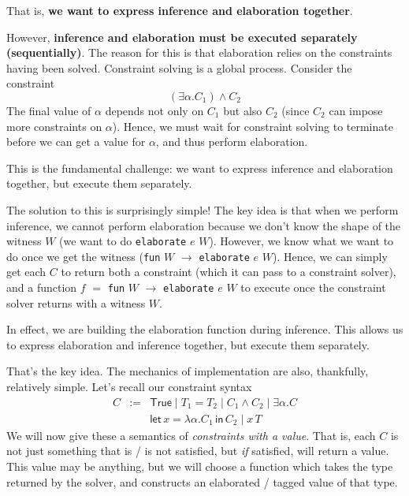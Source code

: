 {That is, \textbf{we want to express inference and elaboration together}. 

However, \textbf{inference and elaboration must be executed separately (sequentially)}. The reason for this is that elaboration relies on the constraints having been solved. Constraint solving is a global process. Consider the constraint 
\[(\exists \alpha. C_1) \land C_2\]
The final value of $\alpha$ depends not only on $C_1$ but also $C_2$ (since $C_2$ can impose more constraints on $\alpha$). Hence, we must wait for constraint solving to terminate before we can get a value for $\alpha$, and thus perform elaboration.

This is the fundamental challenge: we want to express inference and elaboration together, but execute them separately.

The solution to this is surprisingly simple! The key idea is that when we perform inference, we cannot perform elaboration because we don't know the shape of the witness $W$ (we want to do \texttt{elaborate} $e$ $W$). However, we know what we want to do once we get the witness (\texttt{fun} $W$ $\to$ \texttt{elaborate} $e$ $W$). Hence, we can simply get each $C$ to return both a constraint (which it can pass to a constraint solver), and a function $f$ $=$ \texttt{fun} $W$ $\to$ \texttt{elaborate} $e$ $W$ to execute once the constraint solver returns with a witness $W$. 

In effect, we are building the elaboration function during inference. This allows us to express elaboration and inference together, but execute them separately. 

That's the key idea. The mechanics of implementation are also, thankfully, relatively simple. Let's recall our constraint syntax
\[\begin{array}{lcl}
     C&:=&\textsf{True} \mid T_1 = T_2 \mid C_1 \land C_2 \mid \exists \alpha . C \\
        &&\textsf{let}\, x = \lambda \alpha . C_1 \, \textsf{in} \, C_2 \mid x \, T
     \end{array}
\]
We will now give these a semantics of \textit{constraints with a value}. That is, each $C$ is not just something that is / is not satisfied, but \textit{if} satisfied, will return a value. This value may be anything, but we will choose a function which takes the type returned by the solver, and constructs an elaborated / tagged value of that type. 

}
